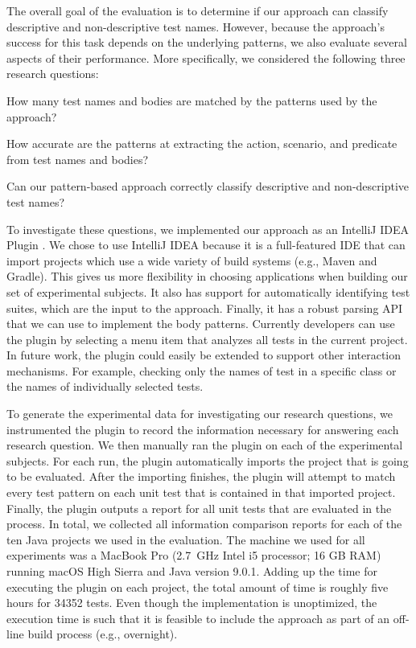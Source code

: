 \documentclass[proposal.tex]{subfiles}
\begin{document}
The overall goal of the evaluation is to determine if our approach can classify descriptive and non-descriptive test names. 
%
However, because the approach's success for this task depends on the underlying patterns, we also evaluate several aspects of their performance.
%
More specifically, we considered the following three research questions:
\begin{description}[font=\normalfont\emph]
\item[RQ1---Feasibility.] How many test names and bodies are matched by the patterns used by the approach?
\item[RQ2---Accuracy.] How accurate are the patterns at extracting the action, scenario, and predicate from test names and bodies?
\item[RQ3---Effectiveness.] Can our pattern-based approach correctly classify descriptive and non-descriptive test names?
\end{description}


To investigate these questions, we implemented our approach as an IntelliJ IDEA Plugin \cite{IntelliJPlugin}.
%
We chose to use IntelliJ IDEA because it is a full-featured IDE that can import projects which use a wide variety of build systems (e.g., Maven and Gradle).
%
This gives us more flexibility in choosing applications when building our set of experimental subjects.
%
It also has support for automatically identifying test suites, which are the input to the approach.
%
Finally, it has a robust parsing API that we can use to implement the body patterns.
Currently developers can use the plugin by selecting a menu item that analyzes all tests in the current project.
%
In future work, the plugin could easily be extended to support other interaction mechanisms.
%
For example, checking only the names of test in a specific class or the names of individually selected tests.


To generate the experimental data for investigating our research questions, we instrumented the plugin to record the information necessary for answering each research question.
%
We then manually ran the plugin on each of the experimental subjects.
%
For each run, the plugin automatically imports the project that is going to be evaluated.
%
After the importing finishes, the plugin will attempt to match every test pattern on each unit test that is contained in that imported project.
%
Finally, the plugin outputs a report for all unit tests that are evaluated in the process.
%
In total, we collected all information comparison reports for each of the ten Java projects we used in the evaluation.
%
The machine we used for all experiments was a MacBook Pro (\SI{2.7}{\giga\hertz} Intel i5 processor; 16 GB RAM) running macOS High Sierra and Java version 9.0.1.
%
Adding up the time for executing the plugin on each project, the total amount of time is roughly five hours for \num{34352} tests.
%
Even though the implementation is unoptimized, the execution time is such that it is feasible to include the approach as part of an off-line build process (e.g., overnight).
\end{document}
